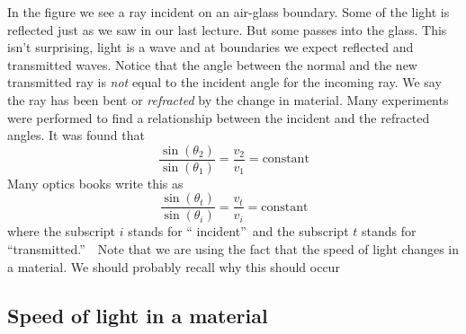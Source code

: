 \documentclass{article}
\begin{document}

In the figure we see a ray incident on an air-glass boundary. Some of the
light is reflected just as we saw in our last lecture. But some passes into
the glass. This isn't surprising, light is a wave and at boundaries we
expect reflected and transmitted waves. Notice that the angle between the
normal and the new transmitted ray is \emph{not} equal to the incident angle
for the incoming ray. We say the ray has been bent or \emph{refracted} by
the change in material. Many experiments were performed to find a
relationship between the incident and the refracted angles. It was found
that 
\begin{equation}
\frac{\sin \left( \theta _{2}\right) }{\sin \left( \theta _{1}\right) }=%
\frac{v_{2}}{v_{1}}=\text{constant}
\end{equation}%
Many optics books write this as 
\begin{equation}
\frac{\sin \left( \theta _{t}\right) }{\sin \left( \theta _{i}\right) }=%
\frac{v_{t}}{v_{i}}=\text{constant}
\end{equation}%
where the subscript $i$ stands for \textquotedblleft
incident\textquotedblright\ and the subscript $t$ stands for
\textquotedblleft transmitted.\textquotedblright\ \ Note that we are using the fact
that the speed of light changes in a material. We should probably recall why
this should occur

\subsection{Speed of light in a material}
\end{document}

